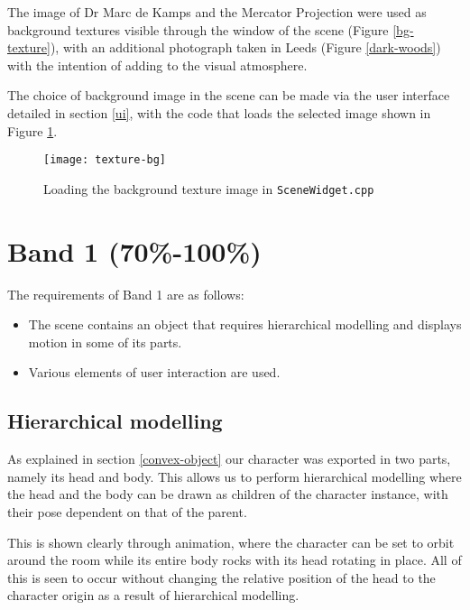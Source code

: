 \documentclass{article}
\begin{document}
		\bigskip
		
		The image of Dr Marc de Kamps and the Mercator Projection were
		used as background textures visible through the window of the scene (Figure \ref{bg-texture}),
		with an additional photograph taken in Leeds (Figure \ref{dark-woods}) with the intention of adding
		to the visual atmosphere.
		
		\bigskip
		
		The choice of background image in the scene can be made via the user interface detailed
		in section \ref{ui}, with the code that loads the selected image shown in Figure \ref{texture-bg}.
		
		\bigskip
		
		\begin{figure}[H]
			\centering	
			\texttt{[image: texture-bg]}
			\caption{Loading the background texture image in \texttt{SceneWidget.cpp}}
			\label{texture-bg}
		\end{figure}



	\clearpage
	\section{Band 1 (70\%-100\%)}
		The requirements of Band 1 are as follows:
		\begin{itemize}
			\item The scene contains an object that requires hierarchical modelling and displays motion in some of its parts.
			\item Various elements of user interaction are used.
		\end{itemize}
		\subsection{Hierarchical modelling}\label{hier}
		As explained in section \ref{convex-object} our character was exported in two parts,
		namely its head and body. This allows us to perform hierarchical modelling where the head and the body
		can be drawn as children of the character instance, with their pose dependent on that of the parent.
		
		\bigskip
		
		This is shown clearly through animation, where the character can be set to orbit around the room while
		its entire body rocks with its head rotating in place. All of this is seen
		to occur without changing the relative position of the head to the character origin as a result of
		hierarchical modelling.
\end{document}
